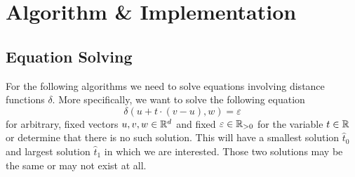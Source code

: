 \section{Algorithm \& Implementation}
\label{sec:algorithm_implementation}


\subsection{Equation Solving}
\label{subsec:equation_solving}
For the following algorithms we need to solve equations involving distance functions \(\delta\). More specifically, we want to solve the following equation 
\begin{equation}
  \delta(u + t \cdot (v - u), w) = \varepsilon \label{eq:eq_solve_main}
\end{equation}
for arbitrary, fixed vectors \(u, v, w \in \mathbb{R}^d\) and fixed \(\varepsilon \in \mathbb{R}_{>0}\) for the variable \(t \in \mathbb{R}\) or determine that there is no such solution. This will have a smallest solution \(\hat{t}_0\) and largest solution \(\hat{t}_1\) in which we are interested. Those two solutions may be the same or may not exist at all.

